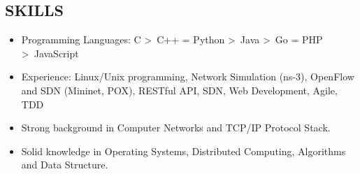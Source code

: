 \documentclass[line]{res}
\begin{document}
\begin{resume}
	\section{SKILLS}
	\begin{itemize}
		\item Programming Languages: C \textgreater \ C++ = Python \textgreater \ Java \textgreater \ Go = PHP \textgreater \ JavaScript
		\item Experience: Linux/Unix programming, Network Simulation (ns-3), OpenFlow and SDN (Mininet, POX), RESTful API, SDN, Web Development, Agile, TDD
		\item Strong background in Computer Networks and TCP/IP Protocol Stack.
		\item Solid knowledge in Operating Systems, Distributed Computing, Algorithms and Data Structure. 

	\end{itemize}


\end{resume}
\end{document}
